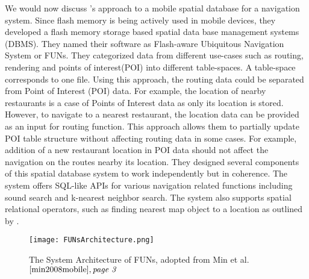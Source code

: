 We would now discuss \citet{min2008mobile}'s approach to a mobile spatial database for a navigation system. Since flash memory is being actively used in mobile devices, they developed a flash memory storage based spatial data base management systems (DBMS). They named their software as Flash-aware Ubiquitous Navigation System or FUNs. They categorized data from different use-cases such as routing, rendering and points of interest(POI) into different table-spaces. A table-space corresponds to one file. Using this approach, the routing data could be separated from Point of Interest (POI) data. For example, the location of nearby restaurants is a case of Points of Interest data as only its location is stored. However, to navigate to a nearest restaurant, the location data can be provided as an input for routing function. This approach allows them to partially update POI table structure without affecting routing data in some cases. For example, addition of a new restaurant location in POI data should not affect the navigation on the routes nearby its location. They designed several components of this spatial database system to work independently but in coherence. The system offers SQL-like APIs for various navigation related functions including sound search and k-nearest neighbor search. The system also supports spatial relational operators, such as finding nearest map object to a location as outlined by \citet{lee1998perf}. \\
\begin{figure}
\texttt{[image: FUNsArchitecture.png]}
\caption{The System Architecture of FUNs, adopted from Min et al.$\cite{min2008mobile}, \textit{page 3}$}
\label{fg:sysArchFun}
\end{figure}

